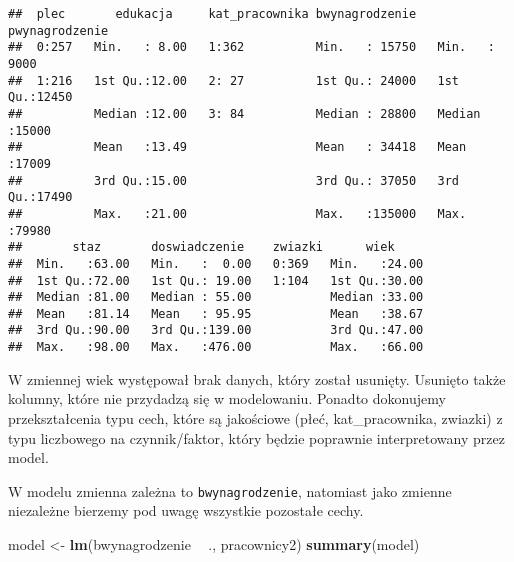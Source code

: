 \documentclass[]{book}
\newenvironment{Shaded}{\begin{snugshade}}{\end{snugshade}}
\newcommand{\KeywordTok}[1]{\textcolor[rgb]{0.13,0.29,0.53}{\textbf{#1}}}
\newcommand{\StringTok}[1]{\textcolor[rgb]{0.31,0.60,0.02}{#1}}
\newcommand{\OperatorTok}[1]{\textcolor[rgb]{0.81,0.36,0.00}{\textbf{#1}}}
\newcommand{\NormalTok}[1]{#1}
\begin{document}
\begin{verbatim}
##  plec       edukacja     kat_pracownika bwynagrodzenie   pwynagrodzenie 
##  0:257   Min.   : 8.00   1:362          Min.   : 15750   Min.   : 9000  
##  1:216   1st Qu.:12.00   2: 27          1st Qu.: 24000   1st Qu.:12450  
##          Median :12.00   3: 84          Median : 28800   Median :15000  
##          Mean   :13.49                  Mean   : 34418   Mean   :17009  
##          3rd Qu.:15.00                  3rd Qu.: 37050   3rd Qu.:17490  
##          Max.   :21.00                  Max.   :135000   Max.   :79980  
##       staz       doswiadczenie    zwiazki      wiek      
##  Min.   :63.00   Min.   :  0.00   0:369   Min.   :24.00  
##  1st Qu.:72.00   1st Qu.: 19.00   1:104   1st Qu.:30.00  
##  Median :81.00   Median : 55.00           Median :33.00  
##  Mean   :81.14   Mean   : 95.95           Mean   :38.67  
##  3rd Qu.:90.00   3rd Qu.:139.00           3rd Qu.:47.00  
##  Max.   :98.00   Max.   :476.00           Max.   :66.00
\end{verbatim}

W zmiennej wiek występował brak danych, który został usunięty. Usunięto
także kolumny, które nie przydadzą się w modelowaniu. Ponadto dokonujemy
przekształcenia typu cech, które są jakościowe (płeć, kat\_pracownika,
zwiazki) z typu liczbowego na czynnik/faktor, który będzie poprawnie
interpretowany przez model.

W modelu zmienna zależna to \texttt{bwynagrodzenie}, natomiast jako
zmienne niezależne bierzemy pod uwagę wszystkie pozostałe cechy.

\begin{Shaded}
\begin{Highlighting}[]
\NormalTok{model <-}\StringTok{ }\KeywordTok{lm}\NormalTok{(bwynagrodzenie }\OperatorTok{~}\StringTok{ }\NormalTok{., pracownicy2)}
\KeywordTok{summary}\NormalTok{(model)}
\end{Highlighting}
\end{Shaded}
\end{document}
